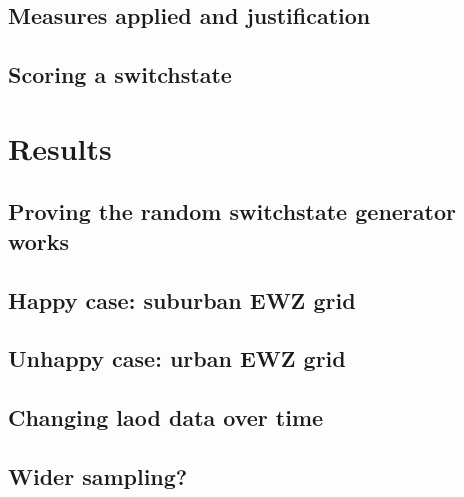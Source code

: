 \documentclass[a4paper]{report}
\begin{document}




\section{Measures applied and justification}


\section{Scoring a switchstate}


\chapter{Results}

\section{Proving the random switchstate generator works}


\section{Happy case: suburban EWZ grid}

\section{Unhappy case: urban EWZ grid}

\section{Changing laod data over time}

\section{Wider sampling?}

\printbibliography
\end{document}
